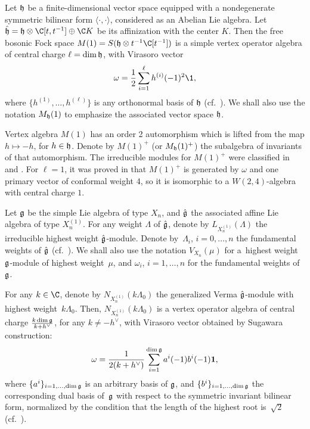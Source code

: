 \documentclass[pdftex]{sigma}
\begin{document}
Let ${\frak h}$ be a f\/inite-dimensional vector space equipped with a
nondegenerate symmetric bilinear form $\langle \cdot, \cdot
\rangle$, considered as an Abelian Lie algebra. Let $\hat{\frak h} =
{\frak h} \otimes {\C}[t,t^{-1}] \oplus {\C} K$ be its af\/f\/inization
with the center $K$. Then the free bosonic Fock space
$M(1) = S({\frak h} \otimes t^{-1} \C[t^{-1}])$ is a simple vertex
operator algebra of central charge $\ell = \dim {\frak h}$, with
Virasoro vector
\[
 \omega =\frac{1}{2} \sum _{i=1}^{\ell} h^{(i)}(-1)^2 {\1},\]
  where
$\{ h^{(1)}, \ldots , h^{(\ell)} \} $ is any orthonormal basis of
${\frak h}$ (cf.~\cite{FLM, LL}). We shall also use the
notation $M_{\frak h}(1)$ to emphasize the associated vector space
${\frak h}$.

Vertex algebra $M(1)$  has an order 2 automorphism which is lifted
from the map $h \mapsto -h$, for $h \in {\frak h}$. Denote by  $M(1)
^+$ (or $M_{\frak h}(1) ^+$) the subalgebra of invariants of that
automorphism. The irreducible modules for $M(1) ^+$ were classif\/ied
in \cite{DN1} and \cite{DN2}. For $\ell =1$, it was proved in
\cite{DG} that $M(1) ^+$ is generated by $\omega$ and one primary
vector of conformal weight $4$, so it is isomorphic to a
$W(2,4)$-algebra with central charge $1$.

Let $\frak g$ be the simple Lie algebra of type $X_{n}$, and
$\hat{\frak g}$ the associated af\/f\/ine Lie algebra of type
$X_{n}^{(1)}$. For any weight $\Lambda$ of $\hat{\frak g}$, denote
by $L_{X_{n} ^{(1)}}(\Lambda)$ the irreducible highest weight
$\hat{\frak g}$-module. Denote by~$\Lambda _i$, $i=0, \ldots, n$ the
fundamental weights of $\hat{\frak g}$ (cf.~\cite{K1}). We shall
also use the notation $V_{X_n}(\mu)$ for a~highest weight $\frak
g$-module of highest weight~$\mu$, and $\omega _i$, $i=1, \ldots, n$
for the fundamental weights of~$\frak g$.


{\sloppy For any $k \in \C$, denote by $N_{X_{n} ^{(1)}}(k \Lambda _0)$ the
generalized Verma $\hat{\frak g}$-module with highest weight~$k
\Lambda _0$. Then, $N_{X_{n} ^{(1)}}(k \Lambda _0)$ is a vertex
operator algebra of central charge $\frac{k \dim \frak
g}{k+h^{\vee}}$, for any $k \neq - h^{\vee}$, with Virasoro vector
obtained by Sugawara construction:
\begin{gather} \label{Vir-Sugawara}
\omega=\frac{1}{2(k+h^{\vee})}\sum_{i=1}^{\dim {\frak g}}
a^{i}(-1)b^{i}(-1){\bf 1},
\end{gather}
where $\{a^{i}\}_{i=1, \dots, \dim {\frak g}}$ is an arbitrary basis
of ${\frak g}$, and $\{b^{i}\}_{i=1, \dots, \dim {\frak g}}$  the
corresponding dual basis of~${\frak g}$ with respect to the
symmetric invariant bilinear form, normalized by the condition that
the length of the highest root is~$\sqrt{2}$ (cf.~\cite{FrB,FZ,K,LL,L}).

}
\end{document}
